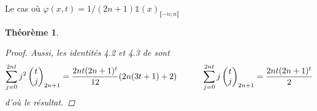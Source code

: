 \documentclass{article}
\newtheorem{theorem}{Théorème}[section]
\theoremstyle{definition}
\begin{document}
\begin{section}{Le cas où $\varphi(x, t) = 1/(2n+1)\mathds{1}(x)_{\llbracket -n; n\rrbracket}$}
\begin{theorem}
\begin{proof}
		Aussi, les identités 4.2 et 4.3 de \cite{h2} sont
		\begin{align*}
			\sum_{j=0}^{2n t} j^2 \begin{pmatrix} t\\j\end{pmatrix}_{2n+1} = \frac{2nt (2n+1)^t}{12} (2n (3t+1)+2) \indent \indent \sum_{j=0}^{2n t} j \begin{pmatrix} t\\j \end{pmatrix}_{2n+1}  = \frac{2 nt (2n+1)^t}{2}
		\end{align*}
		d'où le résultat. 
	\end{proof}
\end{theorem}
%
%
%

\end{section}
\end{document}
